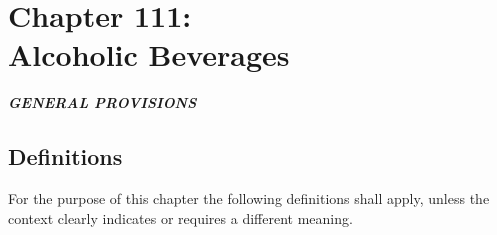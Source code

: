 \chapter*{Chapter 111: \\
	Alcoholic Beverages}
    \minitoc
    \pagebreak

\begin{center}
    \emph{\textbf{\LARGE{GENERAL PROVISIONS}}}
\end{center}

\section{Definitions}
For the purpose of this chapter the following definitions shall apply, unless the context clearly indicates or requires a different meaning.

